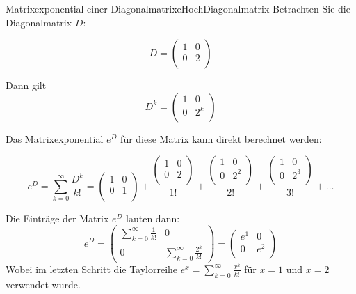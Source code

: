 \begin{bsp}
	{Matrixexponential einer Diagonalmatrix}{eHochDiagonalmatrix}
	Betrachten Sie die Diagonalmatrix $D$:

	$$
		D = \begin{pmatrix}
			1 & 0 \\
			0 & 2 \\
		\end{pmatrix}
	$$

	Dann gilt
	$$ D^k = \begin{pmatrix}
			1 & 0   \\
			0 & 2^k \\
		\end{pmatrix}
	$$

	Das Matrixexponential $e^D$ für diese Matrix kann direkt berechnet werden:

	$$
		e^D = \sum_{k=0}^{\infty} \frac{D^k}{k!} = \begin{pmatrix}
			1 & 0 \\
			0 & 1 \\
		\end{pmatrix} + \frac{\begin{pmatrix}
				1 & 0 \\
				0 & 2 \\
			\end{pmatrix}}{1!} + \frac{\begin{pmatrix}
				1 & 0   \\
				0 & 2^2 \\
			\end{pmatrix}}{2!} + \frac{\begin{pmatrix}
				1 & 0   \\
				0 & 2^3 \\
			\end{pmatrix}}{3!} + \ldots
	$$

	Die Einträge der Matrix $e^D$ lauten dann:
	$$
		e^D = \begin{pmatrix}
			\sum_{k=0}^{\infty} \frac{1}{k!} & 0                                  \\
			0                                & \sum_{k=0}^{\infty} \frac{2^k}{k!}
		\end{pmatrix}
		= \begin{pmatrix}
			e^1 & 0   \\
			0   & e^2 \\
		\end{pmatrix}
	$$
	Wobei im letzten Schritt die Taylorreihe $e^x = \sum_{k=0}^{\infty} \frac{x^k}{k!}$ für $x=1$ und $x=2$ verwendet wurde.
\end{bsp}

